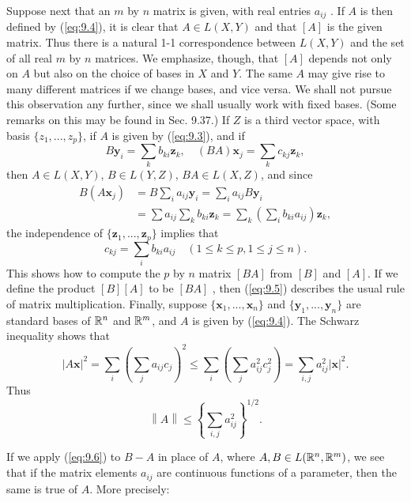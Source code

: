 \begin{mydef}
    Suppose next that an $m$ by $n$ matrix is given, with real entries $a_{ij}$ . 
    If $A$ is then defined by (\ref{eq:9.4}), 
    it is clear that $A \in L(X, Y)$ and that $[A]$ is the given matrix.
    Thus there is a natural 1-1 correspondence between $L(X, Y)$ and the set of all real $m$ by $n$ matrices. 
    We emphasize, though, that $[A]$ depends not only on $A$ but also on the choice of bases in $X$ and $Y$. 
    The same $A$ may give rise to many different matrices if we change bases, and vice versa. 
    We shall not pursue this observation any further, since we shall usually work with fixed bases. 
    (Some remarks on this may be found in Sec. 9.37.)
    If $Z$ is a third vector space, with basis $\{z_1, ... , z_p\}$, 
    if $A$ is given by (\ref{eq:9.3}), and if 
    \begin{equation*}
        B \mathbf{y}_i = \sum_k b_{ki} \mathbf{z}_k, \quad
        (BA) \mathbf{x}_j = \sum_k c_{kj} \mathbf{z}_k, 
    \end{equation*}
    then $A \in L(X, Y)$, $B \in L(Y, Z)$, $BA \in L(X, Z)$, and since
    \begin{align*}
        B(A \mathbf{x}_j)
        &= B \sum_i a_{ij} \mathbf{y}_i 
        = \sum_i a_{ij} B \mathbf{y}_i \\
        &= \sum a_{ij} \sum_k b_{ki} \mathbf{z}_k 
        = \sum_k \left( \sum_i b_{ki} a_{ij} \right) \mathbf{z}_k,
    \end{align*}
    the independence of $\{\mathbf{z}_1,...,\mathbf{z}_p\}$ implies that 
    \begin{equation}
        \label{eq:9.5}
        c_{kj} = \sum_i b_{ki} a_{ij}
        \quad 
        (1 \leq k \leq p,1 \leq j \leq n).
    \end{equation}
    This shows how to compute the $p$ by $n$ matrix $[BA]$ from $[B]$ and $[A]$.
    If we define the product $[B][A]$ to be $[BA]$ , then (\ref{eq:9.5}) describes the usual rule of matrix multiplication.
    Finally, suppose $\{\mathbf{x}_1,...,\mathbf{x}_n\}$ and $\{\mathbf{y}_1,...,\mathbf{y}_n\}$ are standard bases of ${\protect\mathbb R}^n$ and ${\protect\mathbb R}^m$, and $A$ is given by (\ref{eq:9.4}).
    The Schwarz inequality shows that 
    \begin{equation*}
        \left| A \mathbf{x} \right|^2 = 
        \sum_i \left( \sum_j a_{ij} c_j \right)^2 \leq
        \sum_i \left( \sum_j a_{ij}^2 c_j^2 \right) =
        \sum_{i, j} a_{ij}^2 \left| \mathbf{x} \right|^2 .
    \end{equation*}
    Thus 
    \begin{equation}
        \label{eq:9.6}
        \left\| A \right\| \leq 
        \left\{ \sum_{i, j} a_{ij}^2 \right\}^{1/2} .
    \end{equation}

    If we apply (\ref{eq:9.6}) to $B - A$ in place of $A$, 
    where $A, B \in L({\protect\mathbb R}^n, {\protect\mathbb R}^m)$, 
    we see that if the matrix elements $a_{ij}$ are continuous functions of a parameter, then the same is true of $A$. More precisely:
\end{mydef}

